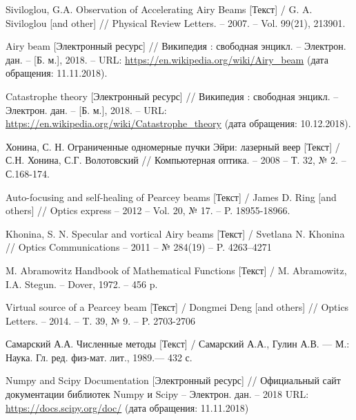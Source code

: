 \def\bibindent{-1cm}
\renewcommand\refname{Список использованных источников}
\begin{thebibliography}{20\kern\bibindent}
\setlength{\itemindent}{1cm}

Siviloglou, G.A. Observation of Accelerating Airy Beams [Текст] / G. A.
Siviloglou [and other] // Physical Review Letters. -- 2007. -- Vol. 99(21), 213901.

	 Airy beam [Электронный ресурс] // Википедия : свободная энцикл. –
Электрон. дан. – [Б. м.], 2018. – URL: \url{https://en.wikipedia.org/wiki/Airy_beam} (дата обращения: 11.11.2018).


	Catastrophe theory [Электронный ресурс] // Википедия : свободная
энцикл. – Электрон. дан. – [Б. м.], 2018. – URL:  \url{https://en.wikipedia.org/wiki/Catastrophe_theory}  (дата обращения: 10.12.2018).


	
	  Хонина, С. Н. Ограниченные одномерные пучки Эйри: лазерный веер
[Текст] / С.Н. Хонина, С.Г. Волотовский // Компьютерная оптика. – 2008 – Т.
32, № 2. – С.168-174. 
	
 Auto-focusing and self-healing of Pearcey beams [Текст] / James D. Ring [and others] // Optics express -- 2012 -- Vol. 20, № 17. -- P. 18955-18966.


Khonina, S. N. Specular and vortical Airy beams [Текст] / Svetlana N.
Khonina // Optics Communications – 2011 – № 284(19) – P. 4263–4271 

 M. Abramowitz Handbook of Mathematical Functions [Текст] / M.
Abramowitz, I.A. Stegun. – Dover, 1972. – 456 p.

Virtual source of a Pearcey beam [Текст] / Dongmei Deng [and others] // Optics Letters. – 2014. –
T. 39, № 9. – P. 2703-2706 

  Самарский А.А. Численные методы  [Текст] / Самарский А.А., Гулин А.В. — М.: Наука. Гл. ред. физ-мат. лит., 1989.— 432 с.

Numpy and Scipy Documentation [Электронный ресурс] // Официальный
сайт документации библиотек Numpy и Scipy – Электрон. дан. – 2018 URL:
\url{https://docs.scipy.org/doc/} (дата обращения: 11.11.2018)


\end{thebibliography}
